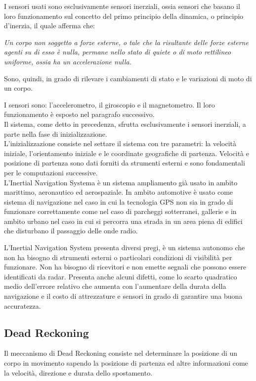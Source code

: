 \documentclass[12pt,a4paper,openright,twoside]{report}
\begin{document}
I sensori usati sono esclusivamente sensori inerziali, ossia sensori che basano il loro funzionamento sul concetto del primo principio della dinamica, o principio d'inerzia, il quale afferma che:
\begin{center}
\emph{Un corpo non soggetto a forze esterne, o tale che la risultante delle forze esterne agenti su di esso è nulla, permane nello stato di quiete o di moto rettilineo uniforme, ossia ha un accelerazione nulla.}
\end{center}
Sono, quindi, in grado di rilevare i cambiamenti di stato e le variazioni di moto di un corpo.

I sensori sono: l'accelerometro, il giroscopio e il magnetometro. Il loro funzionamento è esposto nel paragrafo successivo. \\

Il sistema, come detto in precedenza, sfrutta esclusivamente i sensori inerziali, a parte nella fase di inizializzazione.\\
L'inizializzazione consiste nel settare il sistema con tre parametri: la velocità iniziale, l'orientamento iniziale e le coordinate geografiche di partenza. Velocità e posizione di partenza sono dati forniti da strumenti esterni e sono fondamentali per le computazioni successive.\\

L'Inertial Navigation Systema è un sistema ampliamento già usato in ambito marittimo, aeronautico ed aerospaziale. 
In ambito automotive è usato come sistema di navigazione nel caso in cui la tecnologia GPS non sia in grado di funzionare correttamente come nel caso di parcheggi sotterranei, gallerie e in ambito urbano nel caso in cui si percorra una strada in un area piena di edifici che disturbano il passaggio delle onde radio.

L'Inertial Navigation System presenta diversi pregi, è un sistema autonomo che non ha bisogno di strumenti esterni o particolari condizioni di visibilità per funzionare. Non ha bisogno di ricevitori e non emette segnali che possono essere identificati da radar.
Presenta anche alcuni difetti, come lo scarto quadratico medio dell'errore relativo che aumenta con l'aumentare della durata della navigazione e il costo di attrezzature e sensori in grado di garantire una buona accuratezza.

\subsection{Dead Reckoning}
Il meccanismo di Dead Reckoning consiste nel determinare la posizione di un corpo in movimento sapendo la posizione di partenza ed altre informazioni come la velocità, direzione e durata dello spostamento.
\end{document}
